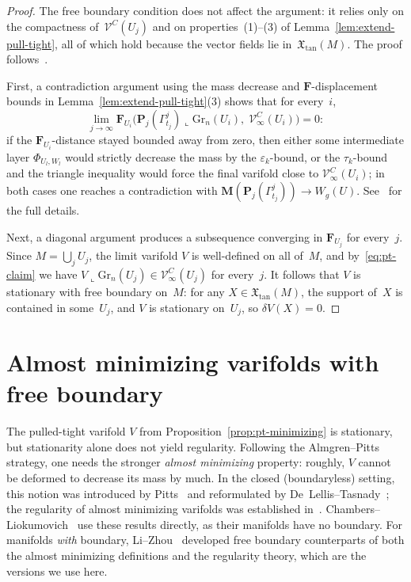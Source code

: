 \begin{proof}
The free boundary condition does not affect the argument: it relies only on the compactness of~$\mathcal{V}^C(U_j)$ and on properties~(1)--(3) of Lemma~\ref{lem:extend-pull-tight}, all of which hold because the vector fields lie in~$\mathfrak{X}_{\mathrm{tan}}(M)$. The proof follows~\cite[\S7]{CL20}.

First, a contradiction argument using the mass decrease and $\mathbf{F}$-displacement bounds in Lemma~\ref{lem:extend-pull-tight}(3) shows that for every~$i$,
\begin{equation}\label{eq:pt-claim}
\lim_{j\to\infty}\mathbf{F}_{U_i}\bigl(\mathbf{P}_j(\Gamma_{t_j}^j)\llcorner\mathrm{Gr}_n(U_i),\;\mathcal{V}^C_\infty(U_i)\bigr)=0:
\end{equation}
if the $\mathbf{F}_{U_i}$-distance stayed bounded away from zero, then either some intermediate layer $\Phi_{U_l,W_l}$ would strictly decrease the mass by the $\varepsilon_k$-bound, or the $\tau_k$-bound and the triangle inequality would force the final varifold close to $\mathcal{V}^C_\infty(U_i)$; in both cases one reaches a contradiction with $\mathbf{M}(\mathbf{P}_j(\Gamma_{t_j}^j))\to W_g(U)$. See~\cite[\S7]{CL20} for the full details.

Next, a diagonal argument produces a subsequence converging in $\mathbf{F}_{U_j}$ for every~$j$. Since $M = \bigcup_j U_j$, the limit varifold $V$ is well-defined on all of~$M$, and by~\eqref{eq:pt-claim} we have $V\llcorner\mathrm{Gr}_n(U_j)\in\mathcal{V}^C_\infty(U_j)$ for every~$j$. It follows that $V$ is stationary with free boundary on~$M$: for any $X\in\mathfrak{X}_{\mathrm{tan}}(M)$, the support of~$X$ is contained in some~$U_j$, and $V$ is stationary on~$U_j$, so $\delta V(X) = 0$.
\end{proof}

\section{Almost minimizing varifolds with free boundary}\label{sec:am-varifolds}

The pulled-tight varifold $V$ from Proposition~\ref{prop:pt-minimizing} is stationary, but stationarity alone does not yield regularity. Following the Almgren--Pitts strategy, one needs the stronger \emph{almost minimizing} property: roughly, $V$ cannot be deformed to decrease its mass by much. In the closed (boundaryless) setting, this notion was introduced by Pitts~\cite{Pit81} and reformulated by De~Lellis--Tasnady~\cite{DLT13}; the regularity of almost minimizing varifolds was established in~\cite{Pit81,DLT13}. Chambers--Liokumovich~\cite{CL20} use these results directly, as their manifolds have no boundary. For manifolds \emph{with} boundary, Li--Zhou~\cite[Sections~4--6]{LZ17} developed free boundary counterparts of both the almost minimizing definitions and the regularity theory, which are the versions we use here.


